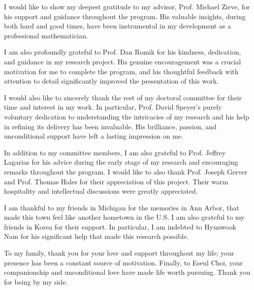 I would like to show my deepest gratitude to my advisor, Prof. Michael Zieve,
for his support and guidance throughout the program.
His valuable insights, during both hard and good times,
have been instrumental in my development as a professional mathematician.

I am also profoundly grateful to Prof. Dan Romik for his kindness, dedication, 
and guidance in my research project.
His genuine encouragement was a crucial motivation for me to complete the program,
and his thoughtful feedback with attention to detail
significantly improved the presentation of this work.

I would also like to sincerely thank the rest of my doctoral committee for their time and interest in my work.
In particular, Prof. David Speyer's purely voluntary dedication to understanding the intricacies of my research and 
his help in refining its delivery has been invaluable.
His brilliance, passion, and unconditional support have left a lasting impression on me.

In addition to my committee members,
I am also grateful to Prof. Jeffrey Lagarias for his advice during the early stage of my research
and encouraging remarks throughout the program.
I would like to also thank Prof. Joseph Gerver and Prof. Thomas Hales for their appreciation of this project.
Their warm hospitality and intellectual discussions were greatly appreciated.

I am thankful to my friends in Michigan for the memories in Ann Arbor,
that made this town feel like another hometown in the U.S.
I am also grateful to my friends in Korea for their support.
In particular, I am indebted to Hyunwook Nam for his significant help that
made this research possible. 

To my family, thank you for your love and support throughout my life;
your presence has been a constant source of motivation.
Finally, to Eseul Choi, 
your companionship and unconditional love have made life worth pursuing.
Thank you for being by my side.